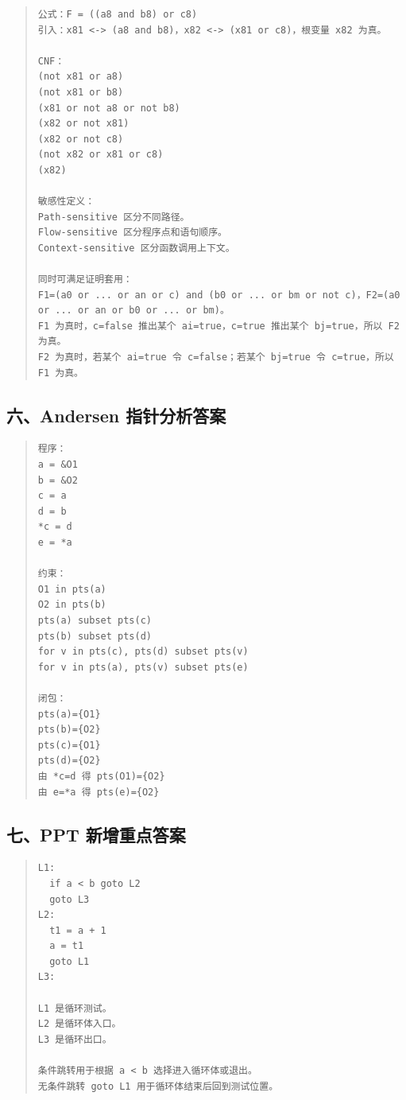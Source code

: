 \documentclass[UTF8,zihao=-4]{ctexart}
\begin{document}
\begin{quote}
\footnotesize
\begin{verbatim}
公式：F = ((a8 and b8) or c8)
引入：x81 <-> (a8 and b8)，x82 <-> (x81 or c8)，根变量 x82 为真。

CNF：
(not x81 or a8)
(not x81 or b8)
(x81 or not a8 or not b8)
(x82 or not x81)
(x82 or not c8)
(not x82 or x81 or c8)
(x82)

敏感性定义：
Path-sensitive 区分不同路径。
Flow-sensitive 区分程序点和语句顺序。
Context-sensitive 区分函数调用上下文。

同时可满足证明套用：
F1=(a0 or ... or an or c) and (b0 or ... or bm or not c)，F2=(a0 or ... or an or b0 or ... or bm)。
F1 为真时，c=false 推出某个 ai=true，c=true 推出某个 bj=true，所以 F2 为真。
F2 为真时，若某个 ai=true 令 c=false；若某个 bj=true 令 c=true，所以 F1 为真。
\end{verbatim}
\end{quote}



\subsection{六、Andersen 指针分析答案}


\begin{quote}
\footnotesize
\begin{verbatim}
程序：
a = &O1
b = &O2
c = a
d = b
*c = d
e = *a

约束：
O1 in pts(a)
O2 in pts(b)
pts(a) subset pts(c)
pts(b) subset pts(d)
for v in pts(c), pts(d) subset pts(v)
for v in pts(a), pts(v) subset pts(e)

闭包：
pts(a)={O1}
pts(b)={O2}
pts(c)={O1}
pts(d)={O2}
由 *c=d 得 pts(O1)={O2}
由 e=*a 得 pts(e)={O2}
\end{verbatim}
\end{quote}



\subsection{七、PPT 新增重点答案}


\begin{quote}
\footnotesize
\begin{verbatim}
L1:
  if a < b goto L2
  goto L3
L2:
  t1 = a + 1
  a = t1
  goto L1
L3:

L1 是循环测试。
L2 是循环体入口。
L3 是循环出口。

条件跳转用于根据 a < b 选择进入循环体或退出。
无条件跳转 goto L1 用于循环体结束后回到测试位置。
\end{verbatim}
\end{quote}
\end{document}
